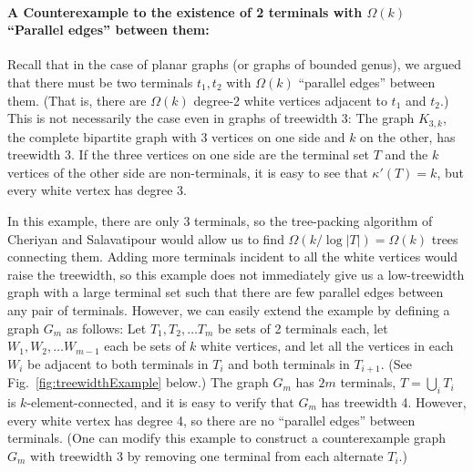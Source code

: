\documentclass[11pt]{article}
\newcommand{\elconn}{\kappa'}
\begin{document}
\medskip
\paragraph{A Counterexample to the existence of 2 terminals with $\Omega(k)$
  ``Parallel edges'' between them:}

Recall that in the case of planar graphs (or graphs of bounded genus),
we argued that there must be two terminals $t_1, t_2$ with $\Omega(k)$
``parallel edges'' between them. (That is, there are $\Omega(k)$
degree-2 white vertices adjacent to $t_1$ and $t_2$.)  This is not
necessarily the case even in graphs of treewidth 3:
The graph $K_{3,k}$, the complete bipartite graph with 3 vertices on
one side and $k$ on the other, has treewidth 3. If the three vertices
on one side are the terminal set $T$ and the $k$ vertices of the other
side are non-terminals, it is easy to see that $\elconn(T) = k$, but
every white vertex has degree 3.

In this example, there are only 3 terminals, so the tree-packing
algorithm of Cheriyan and Salavatipour \cite{cs} would allow us to
find $\Omega(k/\log |T|) = \Omega(k)$ trees connecting them. Adding
more terminals incident to all the white vertices would raise the
treewidth, so this example does not immediately give us a
low-treewidth graph with a large terminal set such that there are few
parallel edges between any pair of terminals. However, we can easily
extend the example by defining a graph $G_m$ as follows: Let $T_1,
T_2, \ldots T_m$ be sets of 2 terminals each, let $W_1, W_2, \ldots
W_{m-1}$ each be sets of $k$ white vertices, and let all the vertices
in each $W_i$ be adjacent to both terminals in $T_i$ and both
terminals in $T_{i+1}$. (See Fig.~\ref{fig:treewidthExample} below.)
The graph $G_m$ has $2m$ terminals, $T = \bigcup_i T_i$ is
$k$-element-connected, and it is easy to verify that $G_m$ has
treewidth 4. However, every white vertex has degree 4, so there are no
``parallel edges'' between terminals. (One can modify this example to
construct a counterexample graph $G_m$ with treewidth 3 by removing one
terminal from each alternate $T_i$.)
\end{document}
